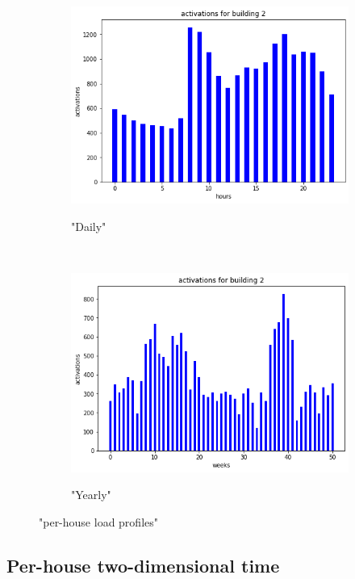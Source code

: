 \begin{figure}[H]
	\begin{subfigure}{.5\textwidth}
		\caption{"Daily"}
		\includegraphics[width=1\linewidth]{../Figures/LPS/SLPdaily2.png}
		\label{fig:SLPdaily2}
	\end{subfigure}%
	~ 
	\begin{subfigure}{.5\textwidth}
		\caption{"Yearly"}
		\includegraphics[width=1\linewidth]{../Figures/LPS/SLPyearly2.png}
		\label{fig:SLPyearly2}
	\end{subfigure}%
	\label{fig:SLP}
	\caption{"per-house load profiles"}
\end{figure}

\subsection{Per-house two-dimensional time}

